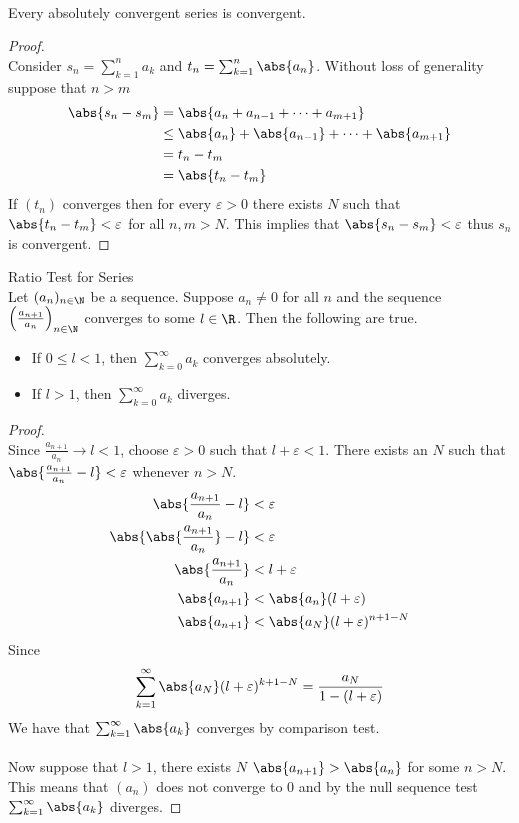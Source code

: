 \documentclass[a4paper]{article}
\begin{document}
\begin{prp}{}{}\\ Every absolutely convergent series is convergent.
\begin{proof}\\ Consider $s_n=\sum_{k=1}^na_k$ and $t_n=\sum_{k=1}^n\abs{a_n}$. Without loss of generality suppose that $n>m$
\begin{align*}
\abs{s_n-s_m}&=\abs{a_n+a_{n-1}+\dots+a_{m+1}}\\
&\leq \abs{a_n}+\abs{a_{n-1}}+\dots+\abs{a_{m+1}}\\
&=t_n-t_m\\
&=\abs{t_n-t_m}
\end{align*}
If $(t_n)$ converges then for every $\varepsilon>0$ there exists $N$ such that $\abs{t_n-t_m}<\varepsilon$ for all $n,m>N$. This implies that $\abs{s_n-s_m}<\varepsilon$ thus $s_n$ is convergent. 
\end{proof}
\end{prp}

\begin{thm}{Ratio Test for Series}{}\\
Let $(a_n)_{n\in\N}$ be a sequence. Suppose $a_n\neq0$ for all $n$ and the sequence $\left(\frac{a_{n+1}}{a_n}\right)_{n\in\N}$ converges to some $l\in\R$. Then the following are true. 
\begin{itemize}
\item If $0\leq l<1$, then $\sum_{k=0}^\infty a_k$ converges absolutely. 
\item If $l>1$, then $\sum_{k=0}^\infty a_k$ diverges. 
\end{itemize}
\begin{proof}\\
Since $\frac{a_{n+1}}{a_n}\to l<1$, choose $\varepsilon>0$ such that $l+\varepsilon<1$. There exists an $N$ such that $\abs{\frac{a_{n+1}}{a_n}-l}<\varepsilon$ whenever $n>N$. 
\begin{align*}
\abs{\frac{a_{n+1}}{a_n}-l}&<\varepsilon\\
\abs{\abs{\frac{a_{n+1}}{a_n}}-l}&<\varepsilon\\
\abs{\frac{a_{n+1}}{a_n}}&<l+\varepsilon\\
\abs{a_{n+1}}&<\abs{a_n}(l+\varepsilon)\\
\abs{a_{n+1}}&<\abs{a_N}(l+\varepsilon)^{n+1-N}\\
\end{align*}
Since $$\sum_{k=1}^{\infty}\abs{a_N}(l+\varepsilon)^{k+1-N}=\frac{a_N}{1-(l+\varepsilon)}$$ We have that $\sum_{k=1}^{\infty}\abs{a_k}$ converges by comparison test. \\~\\
Now suppose that $l>1$, there exists $N$ $\abs{a_{n+1}}>\abs{a_n}$ for some $n>N$. This means that $(a_n)$ does not converge to $0$ and by the null sequence test $\sum_{k=1}^{\infty}\abs{a_k}$ diverges. 
\end{proof}
\end{thm}
\end{document}

